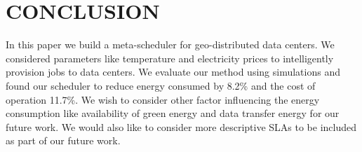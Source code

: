\documentclass[conference,12pt]{IEEEtran}
\begin{document}
\section{CONCLUSION}
\label{sec:conclusion}
In this paper we build a meta-scheduler for geo-distributed data centers. We considered parameters like temperature and electricity prices to intelligently provision jobs to data centers. We evaluate our method using simulations and found our scheduler to reduce energy consumed by 8.2\% and the cost of operation 11.7\%. We wish to consider other factor influencing the energy consumption like availability of green energy and data transfer energy for our future work. We would also like to consider more descriptive SLAs to be included as part of our future work.

{\footnotesize 
}

\end{document}
